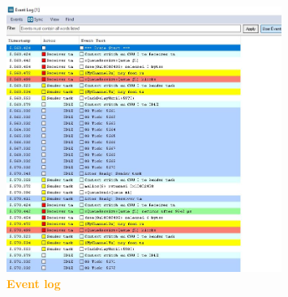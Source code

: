 \documentclass{article}
\begin{document}
\begin{figure}[H]
   \centering
   \includegraphics[width=0.8\textwidth]{figures/trace8.jpg}
   \centering
   \caption{\textbf{\textcolor{Orange}{Event log}}}
\end{figure}
\end{document}
